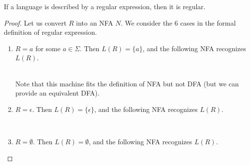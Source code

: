 \documentclass[11pt,a4paper]{article}
\begin{document}
\begin{lemma}
    If a language is described by a regular expression, then it is regular.

    \begin{proof}
        Let us convert $R$ into an NFA $N$. We consider the 6 cases in the formal definition of regular expression.
        \begin{enumerate}
            \item $R=a$ for some $a\in\Sigma$. Then $L(R)=\{a\}$, and the following NFA recognizes $L(R)$. \\
            
             \\

            Note that this machine fits the definition of NFA but not DFA (but we can provide an equivalent DFA).

            \item $R=\epsilon$. Then $L(R)=\{\epsilon\}$, and the following NFA recognizes $L(R)$. \\
            
             \\

            \item $R=\emptyset$. Then $L(R)=\emptyset$, and the following NFA recognizes $L(R)$. \\
            
\end{enumerate}
\end{proof}
\end{lemma}
\end{document}
